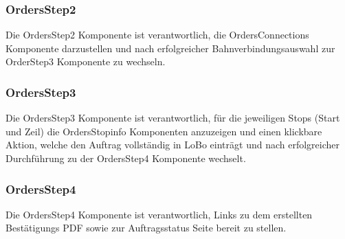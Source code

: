 \subsubsection{OrdersStep2}
Die OrdersStep2 Komponente ist verantwortlich, die OrdersConnections Komponente darzustellen und nach erfolgreicher Bahnverbindungsauswahl zur OrderStep3 Komponente zu wechseln.

\subsubsection{OrdersStep3}
Die OrdersStep3 Komponente ist verantwortlich, für die jeweiligen Stops (Start und Zeil) die OrdersStopinfo Komponenten anzuzeigen und einen klickbare Aktion, welche den Auftrag vollständig in LoBo einträgt und nach erfolgreicher Durchführung zu der OrdersStep4 Komponente wechselt.

\subsubsection{OrdersStep4}
Die OrdersStep4 Komponente ist verantwortlich, Links zu dem erstellten Bestätigungs PDF sowie zur Auftragsstatus Seite bereit zu stellen.








